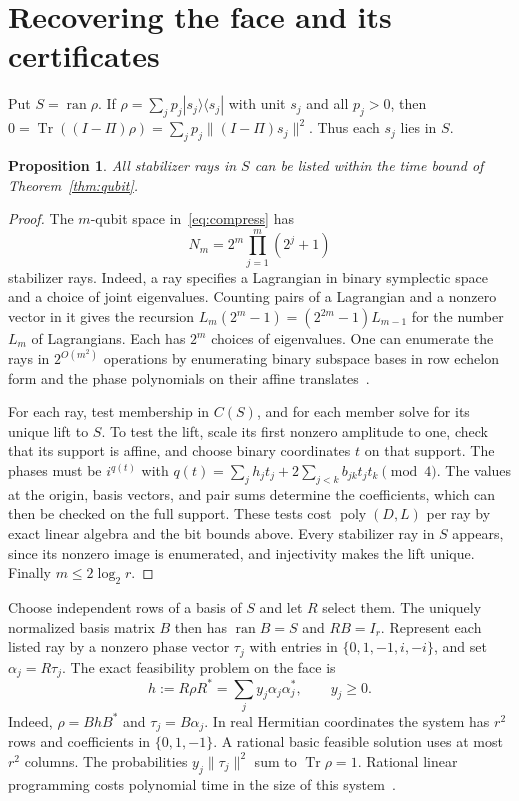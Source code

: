\documentclass[11pt,letterpaper]{article}
\newtheorem{proposition}[theorem]{Proposition}
\theoremstyle{definition}
\numberwithin{equation}{section}
\DeclareMathOperator{\Tr}{Tr}
\DeclareMathOperator{\ran}{ran}
\begin{document}
\section{Recovering the face and its certificates}
Put \(S=\ran\rho\). If \(\rho=\sum_j p_j|s_j\rangle\langle s_j|\) with unit \(s_j\) and all \(p_j>0\), then \(0=\Tr((I-\Pi)\rho)=\sum_jp_j\|(I-\Pi)s_j\|^2\). Thus each \(s_j\) lies in \(S\).
\begin{proposition}\label{prop:list}
All stabilizer rays in \(S\) can be listed within the time bound of Theorem~\ref{thm:qubit}.
\end{proposition}
\begin{proof}
The \(m\)-qubit space in~\eqref{eq:compress} has
\[
N_m=2^m\prod_{j=1}^m(2^j+1)
\]
stabilizer rays. Indeed, a ray specifies a Lagrangian in binary symplectic space and a choice of joint eigenvalues. Counting pairs of a Lagrangian and a nonzero vector in it gives the recursion \(L_m(2^m-1)=(2^{2m}-1)L_{m-1}\) for the number \(L_m\) of Lagrangians. Each has \(2^m\) choices of eigenvalues. One can enumerate the rays in \(2^{O(m^2)}\) operations by enumerating binary subspace bases in row echelon form and the phase polynomials on their affine translates~\cite{ddm}.

For each ray, test membership in \(C(S)\), and for each member solve for its unique lift to \(S\). To test the lift, scale its first nonzero amplitude to one, check that its support is affine, and choose binary coordinates \(t\) on that support. The phases must be \(i^{q(t)}\) with \(q(t)=\sum_j h_jt_j+2\sum_{j<k}b_{jk}t_jt_k\pmod 4\). The values at the origin, basis vectors, and pair sums determine the coefficients, which can then be checked on the full support. These tests cost \(\operatorname{poly}(D,L)\) per ray by exact linear algebra and the bit bounds above. Every stabilizer ray in \(S\) appears, since its nonzero image is enumerated, and injectivity makes the lift unique. Finally \(m\le2\log_2 r\).
\end{proof}

Choose independent rows of a basis of \(S\) and let \(R\) select them. The uniquely normalized basis matrix \(B\) then has \(\ran B=S\) and \(RB=I_r\). Represent each listed ray by a nonzero phase vector \(\tau_j\) with entries in \(\{0,1,-1,i,-i\}\), and set \(\alpha_j=R\tau_j\). The exact feasibility problem on the face is
\begin{equation}\label{eq:lp}
 h:=R\rho R^*=\sum_j y_j\alpha_j\alpha_j^*,\qquad y_j\ge0 .
\end{equation}
Indeed, \(\rho=BhB^*\) and \(\tau_j=B\alpha_j\). In real Hermitian coordinates the system has \(r^2\) rows and coefficients in \(\{0,1,-1\}\). A rational basic feasible solution uses at most \(r^2\) columns. The probabilities \(y_j\|\tau_j\|^2\) sum to \(\Tr\rho=1\). Rational linear programming costs polynomial time in the size of this system~\cite{tardos}.
\end{document}
